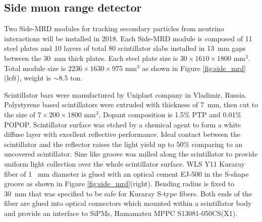 \subsection{Side muon range detector}
Two Side-MRD modules for tracking secondary particles from neutrino interactions will be installed in 2018. 
Each Side-MRD module is composed of 11  steel plates and 10 layers of total 80 scintillator slabs installed  in 13~mm gaps between the 30~mm thick plates. Each steel plate size is  $30\times1610\times1800$ mm$^{3}$. Total module size  is  $2236\times1630\times975$ mm$^{3}$ as shown in Figure \ref{fig:side_mrd} (left), weight is $\sim$8.5 ton. 

Scintillator bars were manufactured by Uniplast company in Vladimir, Russia. Polystyrene based scintillators were extruded with thickness of 7~mm, then cut to the size of $7\times200\times1800$ mm$^{3}$. Dopant composition is  1.5\% PTP and 0.01\% POPOP.
Scintillator surface was etched by a chemical agent to form a white diffuse layer with excellent reflective performance. 
Ideal contact between the scintillator and the reflector raises the light yield up to 50\% comparing to an uncovered scintillator. 
Sine like groove was milled along the scintillator to provide uniform light collection over the whole scintillator surface. 
WLS Y11 Kuraray fiber of 1 ~mm diameter is glued with an optical cement EJ-500 in the S-shape groove  as shown in Figure \ref{fig:side_mrd}(right). Bending radius is fixed to  30~mm that was specified to be safe for Kuraray S-type fibers.
Both ends of the fiber are glued into optical connectors %
which mounted within a scintillator body and provide an interface to SiPMs, Hamamatsu  MPPC S13081-050CS(X1). 


